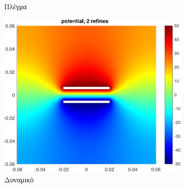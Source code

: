 \documentclass[10pt, letterpaper]{article}
\begin{document}
\begin{figure}[h!]
\begin{subfigure}[b]{0.3\textwidth}
      \caption{Πλέγμα}
      \label{fig:capacitor_mesh}
  \end{subfigure}
  \hfill
  \begin{subfigure}[b]{0.33\textwidth}
    \centering
    \includegraphics[width=\textwidth]{capacitor_potential_2.pdf}
    \caption{Δυναμικό}
    \label{fig:capacitor_potential}
\end{subfigure}
  \caption{}
  \label{}
\end{figure}
\end{document}

